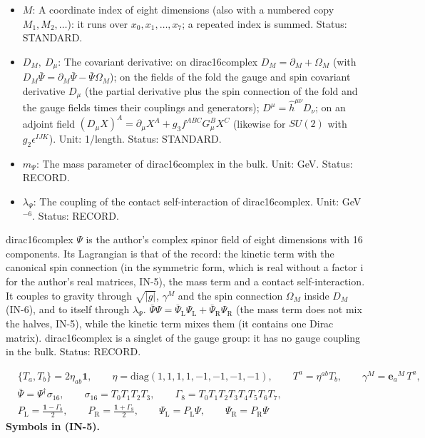 \documentclass[
  10pt,
]{article}
\begin{document}
\begin{itemize}
\item
  \(M\): A coordinate index of eight dimensions (also with a numbered
  copy \(M_1, M_2, \dots\)): it runs over \(x_0, x_1, \dots, x_7\); a
  repeated index is summed. Status: STANDARD.
\item
  \(D_M,\ D_\mu\): The covariant derivative: on dirac16complex
  \(D_M = \partial_M + \Omega_M\) (with
  \(D_M\bar\Psi = \partial_M\bar\Psi - \bar\Psi\Omega_M\)); on the
  fields of the fold the gauge and spin covariant derivative \(D_\mu\)
  (the partial derivative plus the spin connection of the fold and the
  gauge fields times their couplings and generators);
  \(D^\mu = \hat h^{\mu\nu}D_\nu\); on an adjoint field
  \((D_\mu X)^A = \partial_\mu X^A + g_3f^{ABC}G^B_\mu X^C\) (likewise
  for \(SU(2)\) with \(g_2\epsilon^{IJK}\)). Unit: 1/length. Status:
  STANDARD.
\item
  \(m_\Psi\): The mass parameter of dirac16complex in the bulk. Unit:
  GeV. Status: RECORD.
\item
  \(\lambda_\Psi\): The coupling of the contact self-interaction of
  dirac16complex. Unit: GeV\(^{-6}\). Status: RECORD.
\end{itemize}

dirac16complex \(\Psi\) is the author's complex spinor field of eight
dimensions with 16 components. Its Lagrangian is that of the record: the
kinetic term with the canonical spin connection (in the symmetric form,
which is real without a factor \(\mathrm{i}\) for the author's real
matrices, IN-5), the mass term and a contact self-interaction. It
couples to gravity through \(\sqrt{\lvert g\rvert}\), \(\gamma^M\) and
the spin connection \(\Omega_M\) inside \(D_M\) (IN-6), and to itself
through \(\lambda_\Psi\).
\(\bar\Psi\Psi = \bar\Psi_{\mathrm{L}}\Psi_{\mathrm{L}} + \bar\Psi_{\mathrm{R}}\Psi_{\mathrm{R}}\)
(the mass term does not mix the halves, IN-5), while the kinetic term
mixes them (it contains one Dirac matrix). dirac16complex is a singlet
of the gauge group: it has no gauge coupling in the bulk. Status:
RECORD.

\[
\begin{aligned}
&\{T_a, T_b\} = 2\eta_{ab}\mathbf{1},\qquad \eta = \mathrm{diag}(1, 1, 1, 1, -1, -1, -1, -1),\qquad T^a = \eta^{ab}T_b,
 \qquad \gamma^M = \mathbf{e}_a{}^M\,T^a,\\
&\bar\Psi = \Psi^\dagger\sigma_{16},\qquad \sigma_{16} = T_0T_1T_2T_3,\qquad \Gamma_8 = T_0T_1T_2T_3T_4T_5T_6T_7,\\
&P_{\mathrm{L}} = \frac{\mathbf{1} - \Gamma_8}{2},\qquad P_{\mathrm{R}} = \frac{\mathbf{1} + \Gamma_8}{2},\qquad
 \Psi_{\mathrm{L}} = P_{\mathrm{L}}\Psi,\qquad \Psi_{\mathrm{R}} = P_{\mathrm{R}}\Psi
\end{aligned} \tag{IN-5}
\] \textbf{Symbols in (IN-5).}
\end{document}
